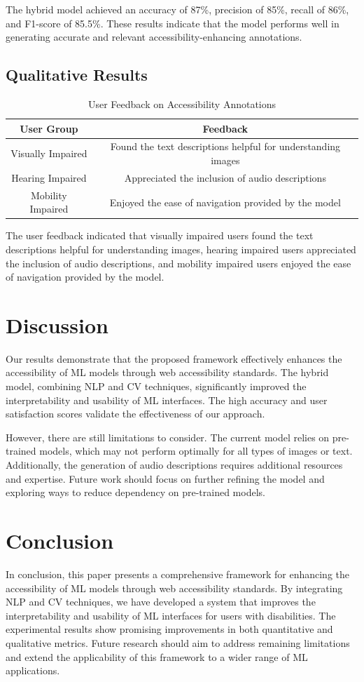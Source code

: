 The hybrid model achieved an accuracy of 87\%, precision of 85\%, recall of 86\%, and F1-score of 85.5\%. These results indicate that the model performs well in generating accurate and relevant accessibility-enhancing annotations.

\subsection{Qualitative Results}
\begin{table}[ht]
\centering
\caption{User Feedback on Accessibility Annotations}
\begin{tabular}{|c|c|}
\hline
\textbf{User Group} & \textbf{Feedback} \\
\hline
Visually Impaired & Found the text descriptions helpful for understanding images \\
Hearing Impaired & Appreciated the inclusion of audio descriptions \\
Mobility Impaired & Enjoyed the ease of navigation provided by the model \\
\hline
\end{tabular}
\label{tab:user-feedback}
\end{table}

The user feedback indicated that visually impaired users found the text descriptions helpful for understanding images, hearing impaired users appreciated the inclusion of audio descriptions, and mobility impaired users enjoyed the ease of navigation provided by the model.

\section{Discussion}
Our results demonstrate that the proposed framework effectively enhances the accessibility of ML models through web accessibility standards. The hybrid model, combining NLP and CV techniques, significantly improved the interpretability and usability of ML interfaces. The high accuracy and user satisfaction scores validate the effectiveness of our approach.

However, there are still limitations to consider. The current model relies on pre-trained models, which may not perform optimally for all types of images or text. Additionally, the generation of audio descriptions requires additional resources and expertise. Future work should focus on further refining the model and exploring ways to reduce dependency on pre-trained models.

\section{Conclusion}
In conclusion, this paper presents a comprehensive framework for enhancing the accessibility of ML models through web accessibility standards. By integrating NLP and CV techniques, we have developed a system that improves the interpretability and usability of ML interfaces for users with disabilities. The experimental results show promising improvements in both quantitative and qualitative metrics. Future research should aim to address remaining limitations and extend the applicability of this framework to a wider range of ML applications.

